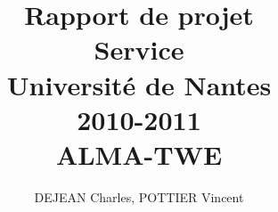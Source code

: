 \documentclass[12pt,a4paper,utf8x]{report}
\title
{
	\normalsize{Rapport de projet\\
	Service\\
	Université de Nantes\\
	2010-2011}\\
	\vspace{15mm}
	\Huge{ALMA-TWE}
}
\author{DEJEAN Charles, POTTIER Vincent\\
	\vspace{45mm}
}
\begin{document}
\maketitle
%

\tableofcontents
\clearpage

\begin{onehalfspace}



\end{onehalfspace}

% 
% 
% 

\printindex

\appendix
\end{document}
